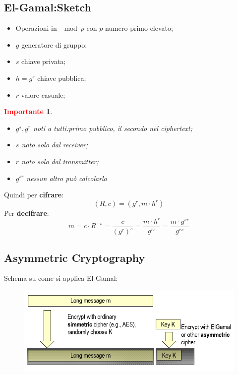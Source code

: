 \documentclass{book}
\newtheorem*{Importante}{\textbf{\textcolor{red}{Importante}}}
\begin{document}
\subsection{El-Gamal:Sketch}
\begin{itemize}
	\item Operazioni in \(\mod{p}\) con \(p\) numero primo elevato;
	\item \(g\) generatore di gruppo;
	\item \(s\) chiave privata;
	\item \(h=g^{s}\) chiave pubblica;
	\item \(r\) valore casuale;
\end{itemize}
\begin{Importante}
	\begin{itemize}
		\item \(g^{s},g^{r}\) noti a tutti:\@il primo pubblico, il secondo nel ciphertext;
		\item \(s\) noto solo dal receiver;
		\item \(r\) noto solo dal transmitter;
		\item \(g^{sr}\) nessun altro può calcolarlo
	\end{itemize}
\end{Importante}
Quindi per \textbf{cifrare}:\begin{equation*}
	(R,c)=(g^{r},m\cdot h^{r})
\end{equation*}
Per \textbf{decifrare}:\begin{equation*}
	m=c\cdot R^{-s}=\frac{c}{{(g^{r})}^{s}}=\frac{m\cdot h^{r}}{g^{rs}}=\frac{m\cdot g^{sr}}{g^{rs}}
\end{equation*}
\newpage
\subsection{Asymmetric Cryptography}
Schema su come si applica El-Gamal:
\begin{figure}[h]
	\centering
	\includegraphics[scale=0.5]{2022-01-03-15-37-08.png}%
\end{figure}
\end{document}
